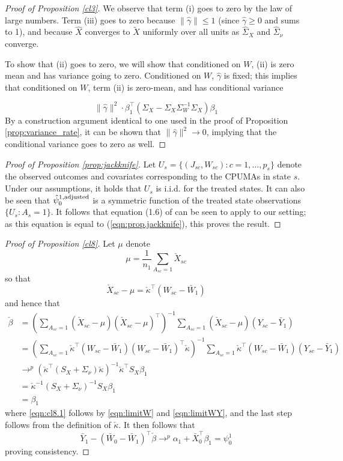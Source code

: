 \begin{proof}[Proof of Proposition \ref{cl3}]
We observe that term (i) goes to zero by the law of large numbers. Term (iii) goes to zero because $\|\hat{\gamma}\| \leq 1$ (since $\hat{\gamma} \geq 0$ and sums to 1), and because $\hat{X}$ converges to $\tilde{X}$ uniformly over all units as $\hat{\Sigma}_X$ and $\hat{\Sigma}_{\nu}$ converge. 

To show that (ii) goes to zero, we will show that conditioned on $W$, (ii) is zero mean and has variance going to zero. Conditioned on $W$, $\hat{\gamma}$ is fixed; this implies that conditioned on $W$, term (ii) is zero-mean, and has conditional variance 

\[ \|\hat{\gamma}\|^2 \cdot \beta_1^\top(\Sigma_X - \Sigma_X\Sigma_W^{-1}\Sigma_X) \beta_1\]
By a construction argument identical to one used in the proof of Proposition \ref{prop:variance_rate}, it can be shown that $\|\hat{\gamma}\|^2\rightarrow 0$, implying that the conditional variance goes to zero as well.
\end{proof}

\begin{proof}[Proof of Proposition \ref{prop:jackknife}]
Let $U_s = \{(J_{sc}, W_{sc}): c = 1,\ldots,p_s\}$ denote the observed outcomes and covariates corresponding to the CPUMAs in state $s$. Under our assumptions, it holds that $U_s$ is i.i.d. for the treated states. It can also be seen that $\hat{\psi}_0^{1,\textup{adjusted}}$ is a symmetric function of the treated state observations $\{U_s: A_s=1\}$. It follows that equation (1.6) of  \cite{efron1981jackknife} can be seen to apply to our setting; as this equation is equal to (\ref{eqn:prop.jackknife}), this proves the result.
\end{proof}

\begin{proof}[Proof of Proposition \ref{cl8}]
Let $\mu$ denote 
\[ \mu = \frac{1}{n_1} \sum_{A_{sc} = 1} \check{X}_{sc}\]
so that
\[ \check{X}_{sc} - \mu = \check{\kappa}^\top(W_{sc} - \bar{W}_1)\]
and hence that 
\begin{align}
 \nonumber \check{\beta} &=  \left(\sum_{A_{sc}=1} (\check{X}_{sc} - \mu)(\check{X}_{sc} - \mu)^\top\right)^{-1} \sum_{A_{sc}=1} (\check{X}_{sc} - \mu)(Y_{sc} - \bar{Y}_1) \\
 \nonumber & = \left(\sum_{A_{sc}=1} \check{\kappa}^\top (W_{sc} - \bar{W}_1)(W_{sc} - \bar{W}_1)^\top \check{\kappa}\right)^{-1} \sum_{A_{sc}=1} \check{\kappa}^\top(W_{sc} - \bar{W}_1)(Y_{sc} - \bar{Y}_1) \\
 & \to^p (\check{\kappa}^\top (S_X + \Sigma_\nu) \check{\kappa})^{-1} \check{\kappa}^\top S_X \beta_1  \label{eqn:cl8.1}\\
 \nonumber 
 & = \check{\kappa}^{-1} (S_X + \Sigma_{\nu})^{-1} S_X \beta_1 \\
 \nonumber 
 & = \beta_1
 \end{align}
 where \eqref{eqn:cl8.1} follows by \eqref{eqn:limitW} and \eqref{eqn:limitWY}, and the last step follows from the definition of $\check{\kappa}$. It then follows that 
 \[ \bar{Y}_1 - (\bar{W}_0 - \bar{W}_1)^\top \check{\beta} \to^p \alpha_1 + \bar{X}_0^\top \beta_1 = \psi_0^1\]
 proving consistency.
\end{proof}

